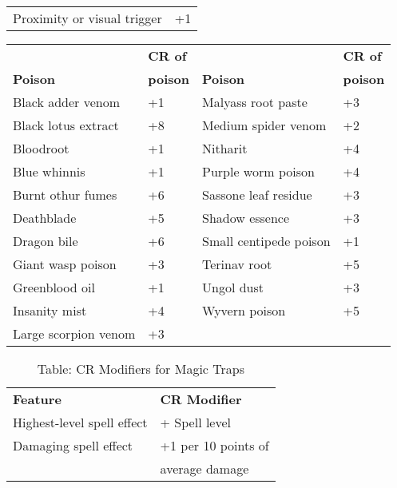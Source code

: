 \begin{table}[]
\begin{tabular}{ll}
Proximity or visual trigger & +1\\
\end{tabular}
\begin{tabular}{ll|ll}
                & \textbf{CR of}  &                 & \textbf{CR of} \\
\textbf{Poison} & \textbf{poison} & \textbf{Poison} & \textbf{poison} \\
Black adder venom & +1 & Malyass root paste & +3\\
Black lotus extract & +8 & Medium spider venom & +2\\
Bloodroot & +1 & Nitharit & +4\\
Blue whinnis & +1 & Purple worm poison & +4\\
Burnt othur fumes & +6 & Sassone leaf residue & +3\\
Deathblade & +5 & Shadow essence & +3\\
Dragon bile & +6 & Small centipede poison & +1\\
Giant wasp poison & +3 & Terinav root & +5\\
Greenblood oil & +1 & Ungol dust & +3\\
Insanity mist & +4 & Wyvern poison & +5\\
Large scorpion venom & +3  &  \\
\end{tabular}
\end{table}

\begin{table}[]
\sffamily
\caption{Table: CR Modifiers for Magic Traps}
\begin{tabular}{ll}
\textbf{Feature} & \textbf{CR Modifier}\\
Highest-level spell effect & + Spell level \\
Damaging spell effect & +1 per 10 points of\\
                      & average damage\\
\end{tabular}
\end{table}

